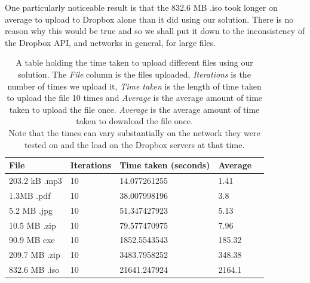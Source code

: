 \documentclass[12pt, titlepage]{article}
\begin{document}
\newline \indent One particularly noticeable result is that the 832.6 MB .iso took longer on average to upload to Dropbox alone than it did using our solution. There is no reason why this would be true and so we shall put it down to the inconsistency of the Dropbox API, and networks in general, for large files.

\bigskip
\begin{table}[H]
\begin{center}
    \begin{tabular}{ | l | l | l | l | l |}
    \hline
    \textbf{File} & \textbf{Iterations} & \textbf{Time taken (seconds)} & \textbf{Average} \\ \hline
    203.2 kB .mp3 & 10 & 14.077261255 & 1.41 \\ \hline
    1.3MB .pdf & 10 & 38.007998196 & 3.8 \\ \hline 
    5.2 MB .jpg & 10 & 51.347427923 & 5.13 \\ \hline
    10.5 MB .zip & 10 & 79.577470975 & 7.96  \\ \hline
    90.9 MB exe & 10 & 1852.5543543 & 185.32 \\ \hline
    209.7 MB .zip & 10 & 3483.7958252 & 348.38 \\ \hline
    832.6 MB .iso & 10 & 21641.247924 & 2164.1 \\ \hline
    \end{tabular}
    \caption{A table holding the time taken to upload different files using our solution. The \textit{File} column is the files uploaded, \textit{Iterations} is the number of times we upload it, \textit{Time taken} is the length of time taken to upload the file 10 times and \textit{Average} is the average amount of time taken to upload the file once. \textit{Average} is the average amount of time taken to download the file once. \\ Note that the times can vary substantially on the network they were tested on and the load on the Dropbox servers at that time.} \label{tab:uploadBenchmark}
    \end{center}
\end{table}
\end{document}
